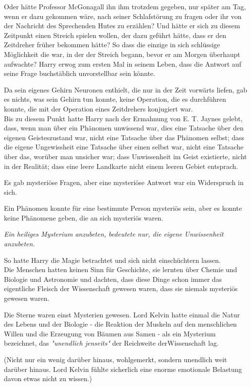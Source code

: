 {Oder hätte Professor McGonagall ihn ihm trotzdem gegeben, nur später am Tag, wenn er dazu gekommen wäre, nach seiner Schlafstörung zu fragen oder ihr von der Nachricht des Sprechenden Hutes zu erzählen? Und hätte er sich zu diesem Zeitpunkt einen Streich spielen wollen, der dazu geführt hätte, dass er den Zeitdreher früher bekommen hätte? So dass die einzige in sich schlüssige Möglichkeit die war, in der der Streich begann, bevor er am Morgen überhaupt aufwachte? Harry erwog zum ersten Mal in seinem Leben, dass die Antwort auf seine Frage buchstäblich unvorstellbar sein könnte.

Da sein eigenes Gehirn Neuronen enthielt, die nur in der Zeit vorwärts liefen, gab es nichts, was sein Gehirn tun konnte, keine Operation, die es durchführen konnte, die mit der Operation eines Zeitdrehers konjugiert war.\\ Bis zu diesem Punkt hatte Harry nach der Ermahnung von E. T. Jaynes gelebt, dass, wenn man über ein Phänomen unwissend war, dies eine Tatsache über den eigenen Geisteszustand war, nicht eine Tatsache über das Phänomen selbst; dass die eigene Ungewissheit eine Tatsache über einen selbst war, nicht eine Tatsache über das, worüber man unsicher war; dass Unwissenheit im Geist existierte, nicht in der Realität; dass eine leere Landkarte nicht einem leeren Gebiet entsprach.

Es gab mysteriöse Fragen, aber eine mysteriöse Antwort war ein Widerspruch in sich.

Ein Phänomen konnte für eine bestimmte Person mysteriös sein, aber es konnte keine Phänomene geben, die an sich mysteriös waren.

\emph{Ein heiliges Mysterium anzubeten, bedeutete nur, die eigene Unwissenheit anzubeten.}

So hatte Harry die Magie betrachtet und sich nicht einschüchtern lassen.\\ Die Menschen hatten keinen Sinn für Geschichte, sie lernten über Chemie und Biologie und Astronomie und dachten, dass diese Dinge schon immer das eigentliche Fleisch der Wissenschaft gewesen waren, dass sie niemals mysteriös gewesen waren.

Die Sterne waren einst Mysterien gewesen. Lord Kelvin hatte einmal die Natur des Lebens und der Biologie - die Reaktion der Muskeln auf den menschlichen Willen und die Erzeugung von Bäumen aus Samen - als ein Mysterium bezeichnet, das \emph{"unendlich jenseits"} der Reichweite derWissenschaft lag.

(Nicht nur ein wenig darüber hinaus, wohlgemerkt, sondern unendlich weit darüber hinaus. Lord Kelvin fühlte sicherlich eine enorme emotionale Belastung davon etwas nicht zu wissen.)

}
